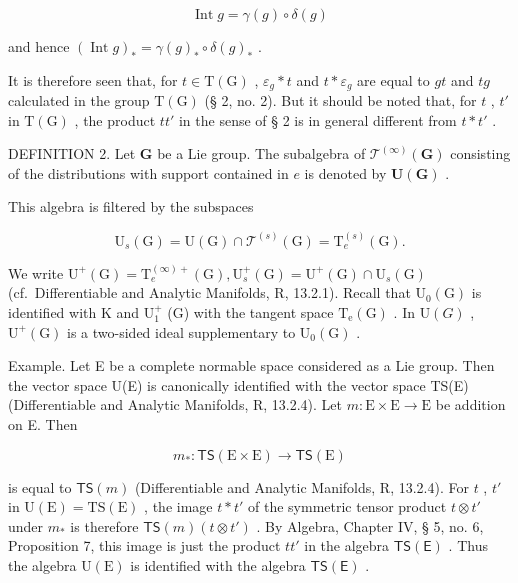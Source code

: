 \[
\operatorname{Int} g = \gamma (g) \circ \delta (g)
\]

and hence \((\operatorname{Int} g)_* = \gamma(g)_* \circ \delta(g)_*\) .

It is therefore seen that, for \(t \in \mathrm{T}(\mathrm{G})\) , \(\varepsilon_g * t\) and \(t * \varepsilon_g\) are equal to \(gt\) and \(tg\) calculated in the group \(\mathrm{T}(\mathrm{G})\) (§ 2, no. 2). But it should be noted that, for \(t\) , \(t'\) in \(\mathrm{T}(\mathrm{G})\) , the product \(tt'\) in the sense of § 2 is in general different from \(t * t'\) .

DEFINITION 2. Let \(\mathbf{G}\) be a Lie group. The subalgebra of \(\mathcal{T}^{(\infty)}(\mathbf{G})\) consisting of the distributions with support contained in \(e\) is denoted by \(\mathbf{U}(\mathbf{G})\) .

This algebra is filtered by the subspaces

\[
\mathrm{U} _ {s} (\mathrm{G}) = \mathrm{U} (\mathrm{G}) \cap \mathcal {T} ^ {(s)} (\mathrm{G}) = \mathrm{T} _ {e} ^ {(s)} (\mathrm{G}).
\]

We write \(\mathrm{U}^{+}(\mathrm{G}) = \mathrm{T}_{e}^{(\infty)+}(\mathrm{G}),\mathrm{U}_{s}^{+}(\mathrm{G}) = \mathrm{U}^{+}(\mathrm{G})\cap \mathrm{U}_{s}(\mathrm{G})\) (cf.~Differentiable and Analytic Manifolds, R, 13.2.1). Recall that \(\mathrm{U}_0(\mathrm{G})\) is identified with K and \(\mathrm{U}_1^+\) (G) with the tangent space \(\mathrm{T_e(G)}\) . In \(\mathrm{U}(G)\) , \(\mathrm{U}^{+}(\mathrm{G})\) is a two-sided ideal supplementary to \(\mathrm{U}_0(\mathrm{G})\) .

Example. Let E be a complete normable space considered as a Lie group. Then the vector space U(E) is canonically identified with the vector space TS(E) (Differentiable and Analytic Manifolds, R, 13.2.4). Let \(m: \mathrm{E} \times \mathrm{E} \to \mathrm{E}\) be addition on E. Then

\[
m _ {*} \colon \mathsf {T S} (\mathrm{E} \times \mathrm{E}) \rightarrow \mathsf {T S} (\mathrm{E})
\]

is equal to \(\mathsf{TS}(m)\) (Differentiable and Analytic Manifolds, R, 13.2.4). For \(t\) , \(t'\) in \(\mathrm{U(E)} = \mathrm{TS(E)}\) , the image \(t * t'\) of the symmetric tensor product \(t \otimes t'\) under \(m_*\) is therefore \(\mathsf{TS}(m)(t \otimes t')\) . By Algebra, Chapter IV, § 5, no. 6, Proposition 7, this image is just the product \(tt'\) in the algebra \(\mathsf{TS(E)}\) . Thus the algebra \(\mathrm{U(E)}\) is identified with the algebra \(\mathsf{TS(E)}\) .

